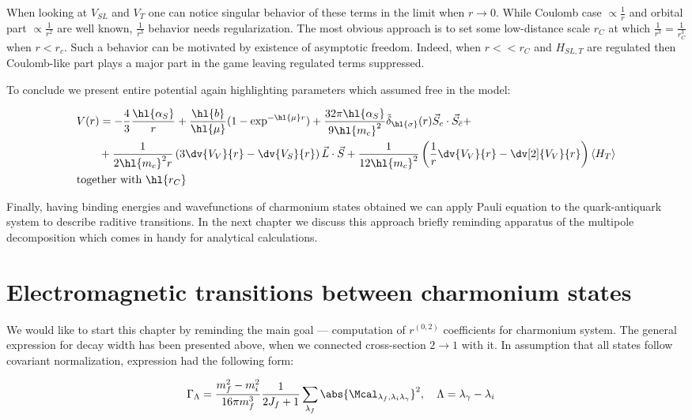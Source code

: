 When looking at $V_{SL}$ and $V_T$ one can notice singular behavior of these terms in the limit when $r \rightarrow 0$. While Coulomb case $\propto \frac{1}{r}$ and orbital part $\propto \frac{1}{r^2}$ are well known, $\frac{1}{r^3}$ behavior needs regularization. The most obvious approach is to set some low-distance scale $r_C$ at which $\frac{1}{r^3} = \frac{1}{r_C^3}$ when $r < r_c$. Such a behavior can be motivated by existence of asymptotic freedom. Indeed, when $r << r_C$ and $H_{SL, T}$ are regulated then Coulomb-like part plays a major part in the game leaving regulated terms suppressed.

To conclude we present entire potential again highlighting parameters which assumed free in the model:

\begin{align}
    &V(r) = -\frac{4}{3} \frac{\hl{\alpha_S}}{r} + \frac{\hl{b}}{\hl{\mu}} (1 - \exp^{-\hl{\mu} r}) + \frac{32 \pi \hl{\alpha_S}}{9 \hl{m_c}^2} \tilde{\delta}_{\hl{\sigma}}(r) \vec{S}_c \cdot \vec{S}_{\bar{c}} + \nonumber \\
    &\qquad+ \frac{1}{2 \hl{m_c}^2 r} \left( 3 \dv{V_V}{r} - \dv{V_S}{r} \right) \vec{L} \cdot \vec{S} + \frac{1}{12 \hl{m_c}^2} \left( \frac{1}{r} \dv{V_V}{r} - \dv[2]{V_V}{r} \right) \left<H_T\right> \nonumber \\
    &\text{together with}~\hl{r_C}
\end{align}

Finally, having binding energies and wavefunctions of charmonium states obtained we can apply Pauli equation to the quark-antiquark system to describe raditive transitions. In the next chapter we discuss this approach briefly reminding apparatus of the multipole decomposition which comes in handy for analytical calculations.

\section{Electromagnetic transitions between charmonium states}
We would like to start this chapter by reminding the main goal --- computation of $r^{(0,2)}$ coefficients for charmonium system. The general expression for decay width has been presented above, when we connected cross-section $2 \rightarrow 1$ with it. In assumption that all states follow covariant normalization, expression had the following form:

\begin{align}
    &\Gamma_{\Lambda} = \frac{m_f^2 - m_i^2}{16 \pi m_f^3} \frac{1}{2J_f + 1} \sum_{\lambda_f} \abs{\Mcal_{\lambda_f, \lambda_i \lambda_\gamma}}^2, \quad \Lambda = \lambda_\gamma - \lambda_i
\end{align}

